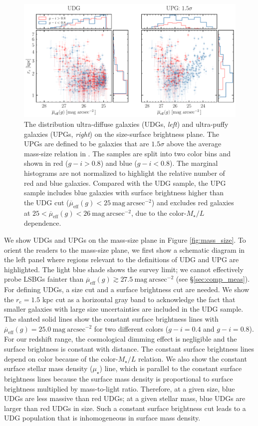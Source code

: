 \documentclass[twocolumn,astrosymb,twocolappendix]{aastex631}
\newcommand{\sbunit}{\mathrm{mag\ arcsec}^{-2}}
\newcommand{\sbeff}{\overline{\mu}_{\mathrm{eff}}(g)}
\begin{document}
\begin{CJK*}{UTF8}{gbsn}
\begin{figure}
	\vbox{ 
		\centering
		\includegraphics[width=1\linewidth]{udg_upg_sample.pdf}
	}
    \caption{The distribution ultra-diffuse galaxies (UDGs, \textit{left}) and ultra-puffy galaxies (UPGs, \textit{right}) on the size-surface brightness plane. The UPGs are defined to be galaxies that are $1.5\sigma$ above the average mass-size relation in \citet{ELVES-I}. The samples are split into two color bins and shown in red ($g-i>0.8$) and blue ($g-i<0.8$). The marginal histograms are not normalized to highlight the relative number of red and blue galaxies. Compared with the UDG sample, the UPG sample includes blue galaxies with surface brightness higher than the UDG cut ($\sbeff < 25\ \sbunit$) and excludes red galaxies at $25 < \sbeff < 26\ \sbunit$, due to the color-$M_\star/L$ dependence.
    }
    \label{fig:udg_upg_re_mu}
\end{figure}


We show UDGs and UPGs on the mass-size plane in Figure \ref{fig:mass_size}. To orient the readers to the mass-size plane, we first show a schematic diagram in the left panel where regions relevant to the definitions of UDG and UPG are highlighted. The light blue shade shows the survey limit; we cannot effectively probe LSBGs fainter than $\sbeff \gtrsim 27.5\ \sbunit$ (see \S\ref{sec:comp_meas}). 
For defining UDGs, a size cut and a surface brightness cut are needed. We show the $r_e = 1.5$ kpc cut as a horizontal gray band to acknowledge the fact that smaller galaxies with large size uncertainties are included in the UDG sample. The slanted solid lines show the constant surface brightness lines with $\sbeff = 25.0\ \sbunit$ for two different colors ($g-i=0.4$ and $g-i=0.8$). For our redshift range, the cosmological dimming effect is negligible and the surface brightness is constant with distance. The constant surface brightness lines depend on color because of the color-$M_\star/L$ relation. We also show the constant surface stellar mass density ($\mu_\star$) line, which is parallel to the constant surface brightness lines because the surface mass density is proportional to surface brightness multiplied by mass-to-light ratio. Therefore, at a given size, blue UDGs are less massive than red UDGs; at a given stellar mass, blue UDGs are larger than red UDGs in size. Such a constant surface brightness cut leads to a UDG population that is inhomogeneous in surface mass density. 


\end{CJK*}
\end{document}
